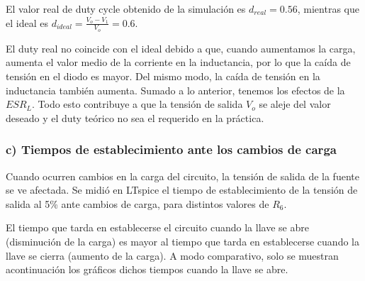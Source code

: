 \documentclass[e4_tp2_main.tex]{subfiles}
\begin{document}
El valor real de duty cycle obtenido de la simulaci\'on es $d_{real}=0.56$, mientras que el ideal es $d_{ideal}= \frac{V_o-V_1}{V_o}=0.6$.


El duty real no coincide con el ideal debido a que, cuando aumentamos la carga, aumenta el valor medio de la corriente en la inductancia, por lo que la ca\'ida de tensi\'on en el diodo es mayor. Del mismo modo, la ca\'ida de tensi\'on en la inductancia tambi\'en aumenta. Sumado a lo anterior, tenemos los efectos de la $ESR_L$. Todo esto contribuye a que la tensi\'on de salida $V_o$ se aleje del valor deseado y el duty te\'orico no sea el requerido en la pr\'actica.


\subsubsection*{c) Tiempos de establecimiento ante los cambios de carga }

Cuando ocurren cambios en la carga del circuito, la tensi\'on de salida de la fuente se ve afectada. Se midi\'o en LTspice el tiempo de establecimiento de la tensi\'on de salida al 5\% ante cambios de carga, para distintos valores de $R_6$. 

El tiempo que tarda en establecerse el circuito cuando la llave se abre (disminuci\'on de la carga) es mayor al tiempo que tarda en establecerse cuando la llave se cierra (aumento de la carga). A modo comparativo, solo se muestran acontinuaci\'on los gr\'aficos dichos tiempos cuando la llave se abre.  
\end{document}
